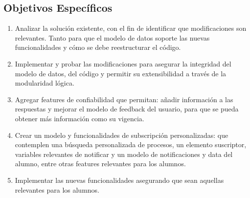 \documentclass[guia]{upropuesta}
\begin{document}
    \subsection*{Objetivos Específicos}\label{sec:obj-e}
        \begin{enumerate}
            \item Analizar la solución existente, con el fin de identificar  que modificaciones son relevantes. Tanto para que el modelo de datos soporte las nuevas funcionalidades y cómo se debe reestructurar el código.
            \item Implementar y probar las modificaciones para asegurar la integridad del modelo de datos, del código y permitir su extensibilidad a través de la modularidad lógica.
            \item Agregar features de confiabilidad que permitan: añadir información a las respuestas y mejorar el modelo de feedback del usuario, para que se pueda obtener más información como su vigencia.
            \item Crear un modelo y funcionalidades de subscripción personalizadas: que contemplen una búsqueda personalizada de procesos, un elemento suscriptor, variables relevantes de notificar y un modelo de notificaciones y data del alumno, entre otras features relevantes para los alumnos.
            \item Implementar las nuevas funcionalidades asegurando que sean aquellas relevantes para los alumnos.
            
        \end{enumerate}
         
\end{document}
